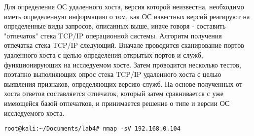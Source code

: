 \documentclass[12pt,a4paper]{report}
\begin{document}
Для определения ОС удаленного хоста, версия которой неизвестна, необходимо иметь определенную информацию о том, как ОС известных версий реагируют на определенные виды запросов, описанных выше, иначе говоря - составить "отпечаток" стека TCP/IP операционной системы.
Алгоритм получения отпечатка стека TCP/IP следующий. Вначале проводится сканирование портов удаленного хоста с целью определения открытых портов и служб, функционирующих на исследуемом хосте. Затем проводится несколько тестов, поэтапно выполняющих опрос стека TCP/IP удаленного хоста с целью выявления   признаков, определяющих версию служб.
На основе полученных от хоста ответов составляется отпечаток, который затем сравнивается с уже имеющейся базой отпечатков, и принимается решение о типе и версии ОС исследуемого хоста.
\begin{verbatim}
root@kali:~/Documents/lab4# nmap -sV 192.168.0.104


\end{verbatim}
\end{document}
